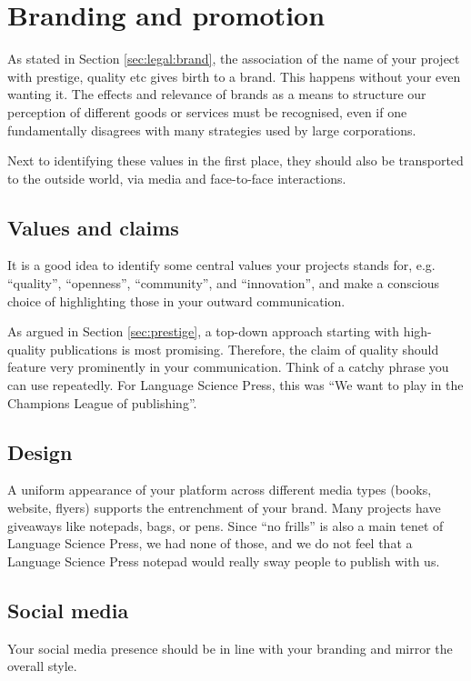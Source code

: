 \documentclass[guidelines,nonflat,modfonts] {langsci/langscibook}
\begin{document}
\section{Branding and promotion}
As stated in Section \ref{sec:legal:brand}, the association of the name of your project with prestige, quality etc gives birth to a brand. This happens without your even wanting it. The effects and relevance of brands as a means to structure our perception of different goods or services must be recognised, even if one  fundamentally disagrees with many strategies used by large corporations. 

Next to identifying these values in the first place, they should also be transported to the outside world, via media and face-to-face interactions. 

\subsection{Values and claims}
It is a good idea to identify some central values your projects stands for, e.g. ``quality'', ``openness'', ``community'', and ``innovation'', and make a conscious choice of highlighting those in your outward communication. 

As argued in Section \ref{sec:prestige}, a top-down approach starting with high-quality publications is most promising. Therefore, the claim of quality should feature very prominently in your communication. Think of a catchy phrase you can use repeatedly. For Language Science Press, this was ``We want to play in the Champions League of publishing''. 

\subsection{Design}
A uniform appearance of your platform across different media types (books, website, flyers) supports the entrenchment of your brand. Many projects have giveaways like notepads, bags, or pens. Since  ``no frills'' is also a main tenet of Language Science Press, we had none of those, and we do not feel that a Language Science Press notepad would really sway people to publish with us. 

\subsection{Social media}
Your social media presence should be in line with your branding and mirror the overall style. 
\end{document}
